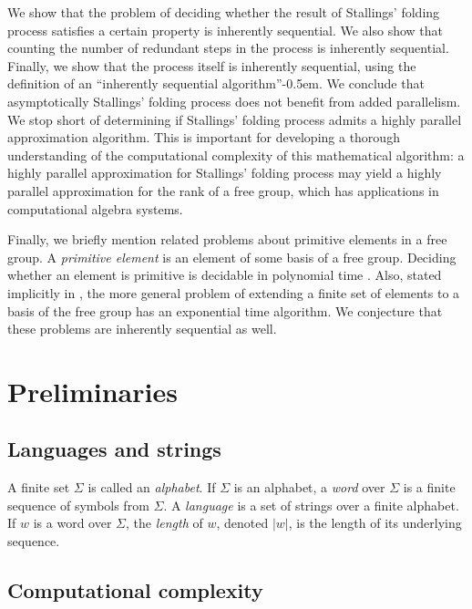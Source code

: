 \documentclass{elsarticlenonatbib}
\begin{document}
%
We show that the problem of deciding whether the result of Stallings' folding process satisfies a certain property is inherently sequential.
We also show that counting the number of redundant steps in the process is inherently sequential.
Finally, we show that the process itself is inherently sequential, using the definition of an ``inherently sequential algorithm''\kern-0.5em.
We conclude that asymptotically Stallings' folding process does not benefit from added parallelism.
We stop short of determining if Stallings' folding process admits a highly parallel approximation algorithm.
This is important for developing a thorough understanding of the computational complexity of this mathematical algorithm: a highly parallel approximation for Stallings' folding process may yield a highly parallel approximation for the rank of a free group, which has applications in computational algebra systems.

Finally, we briefly mention related problems about primitive elements in a free group.
A \emph{primitive element} is an element of some basis of a free group.
Deciding whether an element is primitive is decidable in polynomial time \autocite[Corollary~3.10]{rvw07}.
Also, stated implicitly in \autocite[Theorem~4.4]{cg12}, the more general problem of extending a finite set of elements to a basis of the free group has an exponential time algorithm.
We conjecture that these problems are inherently sequential as well.

\section{Preliminaries}

\subsection{Languages and strings}

A finite set $\Sigma$ is called an \emph{alphabet}.
If $\Sigma$ is an alphabet, a \emph{word} over $\Sigma$ is a finite sequence of symbols from $\Sigma$.
A \emph{language} is a set of strings over a finite alphabet.
If $w$ is a word over $\Sigma$, the \emph{length} of $w$, denoted $|w|$, is the length of its underlying sequence.

\subsection{Computational complexity}
\end{document}
